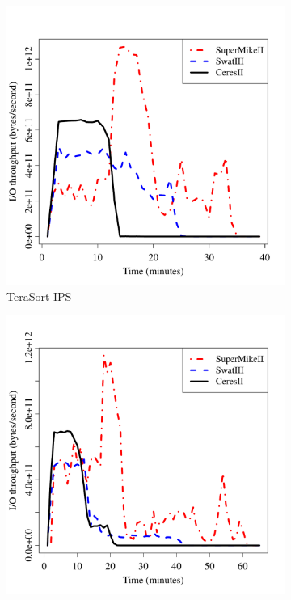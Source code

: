 \documentclass[journal]{IEEEtran}
\begin{document}
\begin{figure}[htb]
	\begin{subfigure}[b]{0.23\textwidth}
                \includegraphics[width=\textwidth]{Figures/SystemFigures/TeraSortIPS.pdf}
                \caption{TeraSort IPS}
                \label{fig:TeraSortIPS}
    \end{subfigure}
 	\begin{subfigure}[b]{0.23\textwidth}
                \includegraphics[width=\textwidth]{Figures/SystemFigures/WordCountIPS.pdf}

\end{subfigure}
\end{figure}
\end{document}

